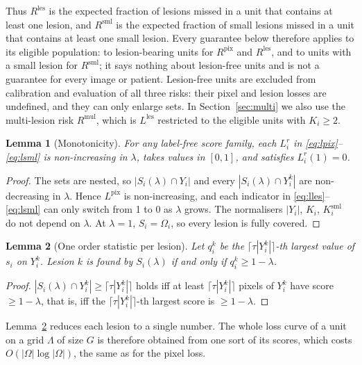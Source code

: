 \documentclass[sn-mathphys-num]{sn-jnl}%
\theoremstyle{thmstyleone}
\newtheorem{lemma}{Lemma}
\theoremstyle{thmstyletwo}
\theoremstyle{thmstylethree}
\newcommand{\1}{\mathbb{1}}
\newcommand{\pix}{\mathrm{pix}}
\newcommand{\les}{\mathrm{les}}
\newcommand{\sml}{\mathrm{sml}}
\newcommand{\mul}{\mathrm{mul}}
\begin{document}
Thus $R^{\les}$ is the expected fraction of lesions missed in a unit that contains at least one lesion, and $R^{\sml}$ is the expected fraction of small lesions missed in a unit that contains at least one small lesion. Every guarantee below therefore applies to its eligible population: to lesion-bearing units for $R^{\pix}$ and $R^{\les}$, and to units with a small lesion for $R^{\sml}$; it says nothing about lesion-free units and is not a guarantee for every image or patient. Lesion-free units are excluded from calibration and evaluation of all three risks: their pixel and lesion losses are undefined, and they can only enlarge sets. In Section~\ref{sec:multi} we also use the multi-lesion risk $R^{\mul}$, which is $L^{\les}$ restricted to the eligible units with $K_i\ge2$.

\begin{lemma}[Monotonicity]\label{lem:mono}
For any label-free score family, each $L_i^r$ in \eqref{eq:lpix}--\eqref{eq:lsml} is non-increasing in $\lambda$, takes values in $[0,1]$, and satisfies $L_i^r(1)=0$.
\end{lemma}
\begin{proof}
The sets are nested, so $|S_i(\lambda)\cap Y_i|$ and every $|S_i(\lambda)\cap Y_i^k|$ are non-decreasing in $\lambda$. Hence $L^{\pix}$ is non-increasing, and each indicator in \eqref{eq:lles}--\eqref{eq:lsml} can only switch from 1 to 0 as $\lambda$ grows. The normalisers $|Y_i|$, $K_i$, $K^{\sml}_i$ do not depend on $\lambda$. At $\lambda=1$, $S_i=\Omega_i$, so every lesion is fully covered.
\end{proof}

\begin{lemma}[One order statistic per lesion]\label{lem:orderstat}
Let $q_i^k$ be the $\lceil\tau|Y_i^k|\rceil$-th largest value of $s_i$ on $Y_i^k$. Lesion $k$ is found by $S_i(\lambda)$ if and only if $q_i^k\ge 1-\lambda$.
\end{lemma}
\begin{proof}
$|S_i(\lambda)\cap Y_i^k|\ge\lceil\tau|Y_i^k|\rceil$ holds iff at least $\lceil\tau|Y_i^k|\rceil$ pixels of $Y_i^k$ have score $\ge1-\lambda$, that is, iff the $\lceil\tau|Y_i^k|\rceil$-th largest score is $\ge1-\lambda$.
\end{proof}

Lemma~\ref{lem:orderstat} reduces each lesion to a single number. The whole loss curve of a unit on a grid $\Lambda$ of size $G$ is therefore obtained from one sort of its scores, which costs $O(|\Omega|\log|\Omega|)$, the same as for the pixel loss.
\end{document}
